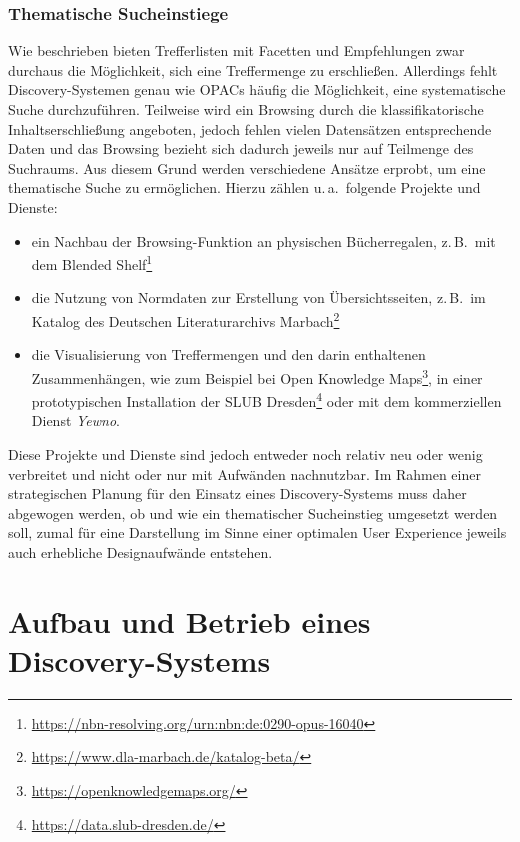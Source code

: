 \documentclass[
  11pt,
  letterpaper,
  DIV=11,
  twoside]{scrreprt}
\DeclareRobustCommand{\href}[2]{#2\footnote{\url{#1}}}
\begin{document}
\subsubsection{Thematische
Sucheinstiege}\label{thematische-sucheinstiege}

Wie beschrieben bieten Trefferlisten mit Facetten und Empfehlungen zwar
durchaus die Möglichkeit, sich eine Treffermenge zu erschließen.
Allerdings fehlt Discovery-Systemen genau wie OPACs häufig die
Möglichkeit, eine systematische Suche durchzuführen. Teilweise wird ein
Browsing durch die klassifikatorische Inhaltserschließung angeboten,
jedoch fehlen vielen Datensätzen entsprechende Daten und das Browsing
bezieht sich dadurch jeweils nur auf Teilmenge des Suchraums. Aus diesem
Grund werden verschiedene Ansätze erprobt, um eine thematische Suche zu
ermöglichen. Hierzu zählen u.\,a.~folgende Projekte und Dienste:

\begin{itemize}
\item
  ein Nachbau der Browsing-Funktion an physischen Bücherregalen,
  z.\,B.~mit dem
  \href{https://nbn-resolving.org/urn:nbn:de:0290-opus-16040}{Blended
  Shelf}
\item
  die Nutzung von Normdaten zur Erstellung von Übersichtsseiten,
  z.\,B.~im \href{https://www.dla-marbach.de/katalog-beta/}{Katalog des
  Deutschen Literaturarchivs Marbach}
\item
  die Visualisierung von Treffermengen und den darin enthaltenen
  Zusammenhängen, wie zum Beispiel bei
  \href{https://openknowledgemaps.org/}{Open Knowledge Maps}, in einer
  \href{https://data.slub-dresden.de/}{prototypischen Installation der
  SLUB Dresden} oder mit dem kommerziellen Dienst \emph{Yewno}.
\end{itemize}

Diese Projekte und Dienste sind jedoch entweder noch relativ neu oder
wenig verbreitet und nicht oder nur mit Aufwänden nachnutzbar. Im Rahmen
einer strategischen Planung für den Einsatz eines Discovery-Systems muss
daher abgewogen werden, ob und wie ein thematischer Sucheinstieg
umgesetzt werden soll, zumal für eine Darstellung im Sinne einer
optimalen User Experience jeweils auch erhebliche Designaufwände
entstehen.

\section{Aufbau und Betrieb eines
Discovery-Systems}\label{aufbau-und-betrieb-eines-discovery-systems}
\end{document}
